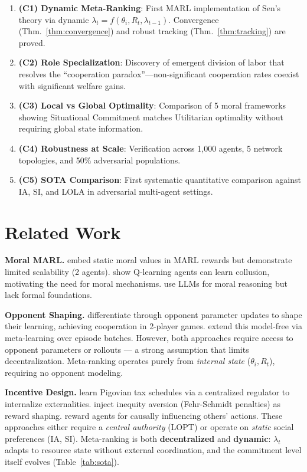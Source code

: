 \documentclass{article}
\begin{document}
\begin{enumerate}
    \item \textbf{(C1) Dynamic Meta-Ranking}: First MARL implementation of Sen's theory via dynamic $\lambda_t{=}f(\theta_i, R_t, \lambda_{t-1})$. Convergence (Thm.~\ref{thm:convergence}) and robust tracking (Thm.~\ref{thm:tracking}) are proved.
    \item \textbf{(C2) Role Specialization}: Discovery of emergent division of labor that resolves the ``cooperation paradox''---non-significant cooperation rates
    coexist with significant welfare gains.
    \item \textbf{(C3) Local vs Global Optimality}: Comparison of 5 moral frameworks showing Situational Commitment matches Utilitarian optimality without requiring global state information.
    \item \textbf{(C4) Robustness at Scale}: Verification across 1,000 agents, 5 network topologies, and 50\% adversarial populations.
    \item \textbf{(C5) SOTA Comparison}: First systematic quantitative comparison against IA, SI, and LOLA in adversarial multi-agent settings.
\end{enumerate}

\section{Related Work}

\textbf{Moral MARL.}
\citet{rodriguez2021multi} embed static moral values in MARL rewards but demonstrate limited scalability (2 agents).
\citet{calvano2020artificial} show Q-learning agents can learn collusion, motivating the need for moral mechanisms.
\citet{christoffersen2023get} use LLMs for moral reasoning but lack formal foundations.

\textbf{Opponent Shaping.}
\citet{foerster2018lola} differentiate through opponent parameter updates to shape their learning, achieving cooperation in 2-player games.
\citet{lu2022mfos} extend this model-free via meta-learning over episode batches.
However, both approaches require access to opponent parameters or rollouts --- a strong assumption that limits decentralization.
Meta-ranking operates purely from \textit{internal state} ($\theta_i, R_t$), requiring no opponent modeling.

\textbf{Incentive Design.}
\citet{yang2023lopt} learn Pigovian tax schedules via a centralized regulator to internalize externalities.
\citet{hughes2018inequity} inject inequity aversion (Fehr-Schmidt penalties) as reward shaping.
\citet{jaques2019social} reward agents for causally influencing others' actions.
These approaches either require a \textit{central authority} (LOPT) or operate on \textit{static} social preferences (IA, SI).
Meta-ranking is both \textbf{decentralized} and \textbf{dynamic}: $\lambda_t$ adapts to resource state without external coordination, and the commitment level itself evolves (Table~\ref{tab:sota}).
\end{document}
